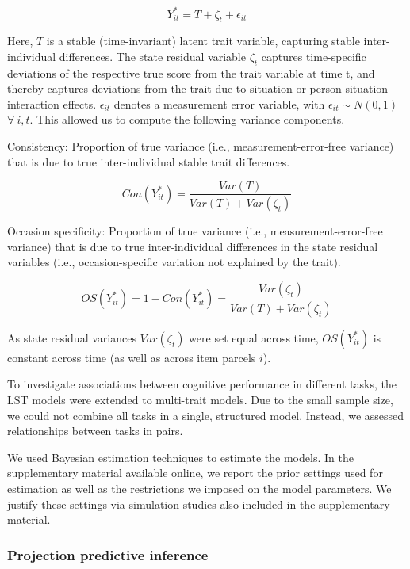 \documentclass[
  man,floatsintext]{apa6}
\begin{document}
\begin{equation}
Y^*_{it}= T + \zeta_t + \epsilon_{it}
\end{equation}

Here, \(T\) is a stable (time-invariant) latent trait variable, capturing stable inter-individual differences. The state residual variable \(\zeta_t\) captures time-specific deviations of the respective true score from the trait variable at time t, and thereby captures deviations from the trait due to situation or person-situation interaction effects. \(\epsilon_{it}\) denotes a measurement error variable, with \(\epsilon_{it} \sim N(0,1)\) \(\forall~ i,t\). This allowed us to compute the following variance components.

Consistency: Proportion of true variance (i.e., measurement-error-free variance) that is due to true inter-individual stable trait differences.

\begin{equation}
Con(Y^*_{it})=\frac{Var(T)}{Var(T)+Var(\zeta_t)}
\end{equation}

Occasion specificity: Proportion of true variance (i.e., measurement-error-free variance) that is due to true inter-individual differences in the state residual variables (i.e., occasion-specific variation not explained by the trait).

\begin{equation}
OS(Y^*_{it})=1-Con(Y^*_{it}) = \frac{Var(\zeta_t)}{Var(T)+Var(\zeta_t)}
\end{equation}

As state residual variances \(Var(\zeta_t)\) were set equal across time, \(OS(Y^*_{it})\) is constant across time (as well as across item parcels \(i\)).

To investigate associations between cognitive performance in different tasks, the LST models were extended to multi-trait models. Due to the small sample size, we could not combine all tasks in a single, structured model. Instead, we assessed relationships between tasks in pairs.

We used Bayesian estimation techniques to estimate the models. In the supplementary material available online, we report the prior settings used for estimation as well as the restrictions we imposed on the model parameters. We justify these settings via simulation studies also included in the supplementary material.

\hypertarget{projection-predictive-inference}{%
\subsubsection{Projection predictive inference}\label{projection-predictive-inference}}
\end{document}
